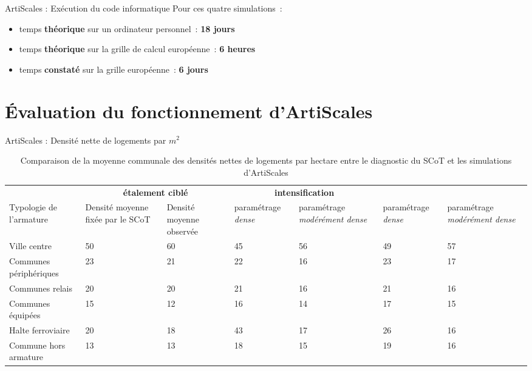 \documentclass[xcolor=table]{beamer}
\begin{document}
\begin{frame}{ArtiScales : Exécution du code informatique}
Pour ces quatre simulations~:
	\begin{itemize}
		\item temps \textbf{théorique} sur un ordinateur personnel~: \textbf{18 jours}
		\item temps \textbf{théorique} sur la grille de calcul européenne~: \textbf{6 heures}
		\item temps \textbf{constaté} sur la grille européenne~: \textbf{6 jours}
	\end{itemize}
\end{frame}

\section{Évaluation du fonctionnement d'ArtiScales}

\begin{frame}{ArtiScales : Densité nette de logements par $m^{2}$}
\begin{table}[h]
	{\footnotesize \caption{Comparaison de la moyenne communale des densités nettes de logements par hectare entre le diagnostic du SCoT et les simulations d'ArtiScales}}	
	\tiny 
	\begin{center}
		\begin{tabular}{m{2.5cm}m{1.5cm}m{1.3cm}m{1cm}m{1cm}m{1cm}m{1cm}}
			\rowcolor[gray]{0.8}
			\multicolumn{3}{c}{Densité moyenne simulée pour le scénario~:}&\multicolumn{2}{c}{\textbf{étalement ciblé}} &\multicolumn{2}{c}{\textbf{intensification}}\\
			
			\rowcolor[gray]{0.9}
			Typologie de l'armature &
			Densité moyenne fixée par le SCoT &
			Densité moyenne observée&
			paramétrage \textit{dense} & paramétrage \textit{modérément dense}& paramétrage \textit{dense} & paramétrage \textit{modérément dense} \\ \hline
			
			Ville centre&50&60&45&56&49&57\\ \hline
			\rowcolor[gray]{0.9}Communes périphériques&23&21&22&16&23&17\\ \hline
			Communes relais &20&20&21&16&21&16\\ \hline
			\rowcolor[gray]{0.9}Communes équipées&15&12&16&14&17&15\\ \hline
			Halte ferroviaire&20&18&43&17&26&16 \\ \hline
			\rowcolor[gray]{0.9}Commune hors armature&13&13&18&15&19&16\\ \hline
		\end{tabular}
	\end{center}
\end{table}
\end{frame}
\end{document}
